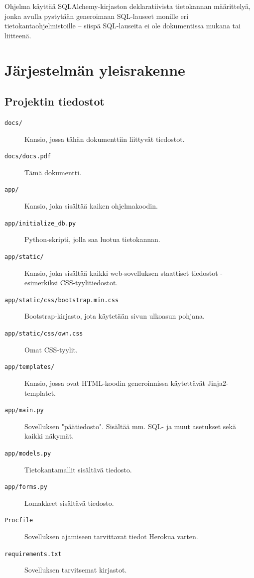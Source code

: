\documentclass{article}
\let\stdsection\section
\renewcommand\section{\newpage\stdsection}
\begin{document}
Ohjelma käyttää SQLAlchemy-kirjaston deklaratiivista tietokannan määrittelyä, jonka avulla pystytään generoimaan SQL-lauseet monille eri tietokantaohjelmistoille -- siispä SQL-lauseita ei ole dokumentissa mukana tai liitteenä.

\section{Järjestelmän yleisrakenne}

\subsection{Projektin tiedostot}

\begin{description}
\item[\texttt{docs/}] Kansio, jossa tähän dokumenttiin liittyvät tiedostot.
\item[\texttt{docs/docs.pdf}] Tämä dokumentti.
\item[\texttt{app/}] Kansio, joka sisältää kaiken ohjelmakoodin.
\item[\texttt{app/initialize\_db.py}] Python-skripti, jolla saa luotua tietokannan.
\item[\texttt{app/static/}] Kansio, joka sisältää kaikki web-sovelluksen staattiset tiedostot - esimerkiksi CSS-tyylitiedostot.
\item[\texttt{app/static/css/bootstrap.min.css}] Bootstrap-kirjasto, jota käytetään sivun ulkoasun pohjana.
\item[\texttt{app/static/css/own.css}] Omat CSS-tyylit.
\item[\texttt{app/templates/}] Kansio, jossa ovat HTML-koodin generoinnissa käytettävät Jinja2-templatet.
\item[\texttt{app/main.py}] Sovelluksen "päätiedosto". Sisältää mm. SQL- ja muut asetukset sekä kaikki näkymät.
\item[\texttt{app/models.py}] Tietokantamallit sisältävä tiedosto.
\item[\texttt{app/forms.py}] Lomakkeet sisältävä tiedosto.
\item[\texttt{Procfile}] Sovelluksen ajamiseen tarvittavat tiedot Herokua varten.
\item[\texttt{requirements.txt}] Sovelluksen tarvitsemat kirjastot.
\end{description}
\end{document}
